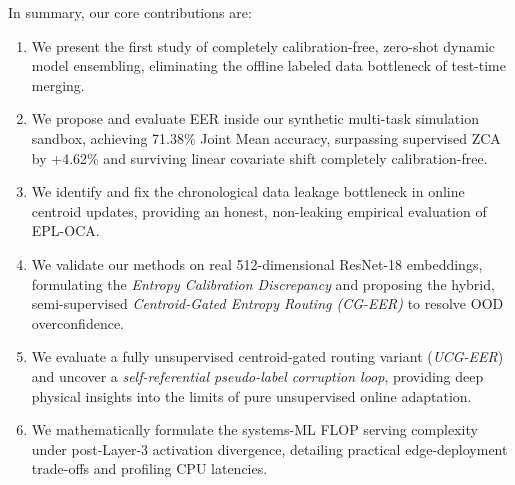 In summary, our core contributions are:
\begin{enumerate}
    \item We present the first study of completely calibration-free, zero-shot dynamic model ensembling, eliminating the offline labeled data bottleneck of test-time merging.
    \item We propose and evaluate EER inside our synthetic multi-task simulation sandbox, achieving 71.38\% Joint Mean accuracy, surpassing supervised ZCA by +4.62\% and surviving linear covariate shift completely calibration-free.
    \item We identify and fix the chronological data leakage bottleneck in online centroid updates, providing an honest, non-leaking empirical evaluation of EPL-OCA.
    \item We validate our methods on real 512-dimensional ResNet-18 embeddings, formulating the \emph{Entropy Calibration Discrepancy} and proposing the hybrid, semi-supervised \emph{Centroid-Gated Entropy Routing (CG-EER)} to resolve OOD overconfidence.
    \item We evaluate a fully unsupervised centroid-gated routing variant (\emph{UCG-EER}) and uncover a \emph{self-referential pseudo-label corruption loop}, providing deep physical insights into the limits of pure unsupervised online adaptation.
    \item We mathematically formulate the systems-ML FLOP serving complexity under post-Layer-3 activation divergence, detailing practical edge-deployment trade-offs and profiling CPU latencies.
\end{enumerate}
